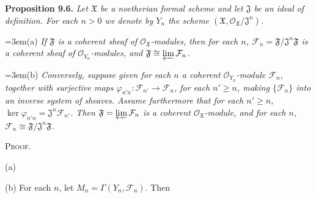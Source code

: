 {\medskip
\noindent\hypertarget{result-II-9.6}{}\textbf{Proposition 9.6.} \emph{Let $\mathfrak X$ be a noetherian formal scheme and let $\mathfrak J$ be an ideal of definition. For each $n>0$ we denote by $Y_n$ the scheme $(\mathfrak X,\mathcal O_{\mathfrak X}/\mathfrak J^n)$.}

\noindent\hangindent=3em\hspace*{1.7em}\hypertarget{result-II-9.6-a}{}(a) \emph{If $\mathfrak F$ is a coherent sheaf of $\mathcal O_{\mathfrak X}$-modules, then for each $n$, $\mathcal F_n=\mathfrak F/\mathfrak J^n\mathfrak F$ is a coherent sheaf of $\mathcal O_{Y_n}$-modules, and $\mathfrak F\cong\varprojlim\mathcal F_n$.}

\noindent\hangindent=3em\hspace*{1.7em}\hypertarget{result-II-9.6-b}{}(b) \emph{Conversely, suppose given for each $n$ a coherent $\mathcal O_{Y_n}$-module $\mathcal F_n$, together with surjective maps $\varphi_{n'n}\colon\mathcal F_{n'}\to\mathcal F_n$, for each $n'\ge n$, making $\{\mathcal F_n\}$ into an inverse system of sheaves. Assume furthermore that for each $n'\ge n$, $\ker\varphi_{n'n}=\mathfrak J^n\mathcal F_{n'}$. Then $\mathfrak F=\varprojlim\mathcal F_n$ is a coherent $\mathcal O_{\mathfrak X}$-module, and for each $n$, $\mathcal F_n\cong\mathfrak F/\mathfrak J^n\mathfrak F$.}

\smallskip
\noindent\textsc{Proof.}

(a) 

(b) \EditionText{}For each $n$, let $M_n=\Gamma(Y_n,\mathcal F_n)$. Then}
